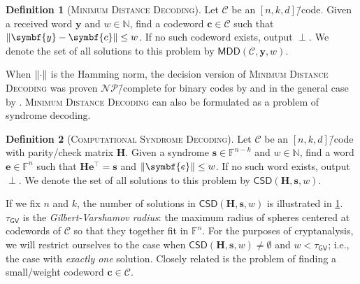 \documentclass[version=last, paper=A4, parskip=half, oneside,%
toc=bibliography, toc=listof, listof=leveldown]{scrbook}
\theoremstyle{plain}
\theoremstyle{definition}
\newtheorem{definition}{Definition}
\theoremstyle{remark}
\renewcommand*{\vec}{\symbf}
\newcommand*{\mat}{\symbf}
\newcommand*{\trans}{\top}%
\newcommand*{\FF}{\ensuremath{\mathbb{F}}}
\newcommand*{\NN}{\ensuremath{\mathbb{N}}}
\newcommand*{\NP}{\ensuremath{\mathcal{NP}}}
\newcommand*{\MDD}{\ensuremath{\mathsf{MDD}}}
\newcommand*{\CSD}{\ensuremath{\mathsf{CSD}}}
\DeclarePairedDelimiter{\norm}{\lVert}{\rVert}
\newcommand*{\GV}{\ensuremath{\mathsf{GV}}}
\begin{document}
\begin{definition}[\textsc{Minimum Distance Decoding}]
  Let \(\mathcal{C}\) be an \([n, k, d]\)\=/code.  Given a received word
  \(\vec{y}\) and \(w \in \NN\), find a codeword \(\vec{c} \in \mathcal{C}\)
  such that \(\norm{\vec{y} - \vec{c}} \le w\).  If no such codeword exists,
  output \(\perp\).  We denote the set of all solutions to this problem by
  \(\MDD(\mathcal{C}, \vec{y}, w)\).
\end{definition}

When \(\norm{\cdot}\) is the Hamming norm, the decision version of
\textsc{Minimum Distance Decoding} was proven \NP\=/complete for binary codes by
\textcite{BEvT78} and in the general case by \textcite{Bar94}.  \textsc{Minimum
  Distance Decoding} can also be formulated as a problem of syndrome decoding.

\begin{definition}[\textsc{Computational Syndrome Decoding}]
  Let \(\mathcal{C}\) be an \([n, k, d]\)\=/code with parity\-/check matrix
  \(\mat{H}\).  Given a syndrome \(\vec{s} \in \FF^{n - k}\) and \(w \in \NN\),
  find a word \(\vec{e} \in \FF^n\) such that
  \(\mat{H} \vec{e}^{\trans} = \vec{s}\) and \(\norm{\vec{e}} \le w\).  If no
  such word exists, output \(\perp\).  We denote the set of all solutions to
  this problem by \(\CSD(\mat{H}, \vec{s}, w)\).
\end{definition}

\begin{figure}
  \centering
  \captionbelow{Number of solutions in
    \(\CSD(\mat{H}, \vec{s}, w)\)}\label{fig:CSD-cardinality}
\end{figure}

If we fix \(n\) and \(k\), the number of solutions in
\(\CSD(\mat{H}, \vec{s}, w)\) is illustrated in \cref{fig:CSD-cardinality}.
\(\tau_{\mathsf{GV}}\) is the \emph{Gilbert\--Varshamov radius}: the maximum
radius of spheres centered at codewords of \(\mathcal{C}\) so that they together
fit in \(\FF^n\).  For the purposes of cryptanalysis, we will restrict ourselves
to the case when \(\CSD(\mat{H}, \vec{s}, w) \ne \emptyset\) and
\(w < \tau_{\mathsf{GV}}\); i.e., the case with \emph{exactly one} solution.
Closely related is the problem of finding a small\-/weight codeword
\(\vec{c} \in \mathcal{C}\).
\end{document}
